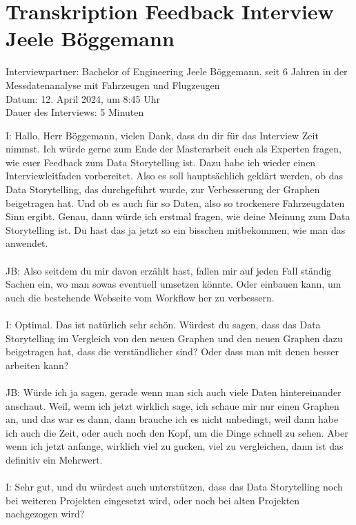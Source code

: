 \section{Transkription Feedback Interview Jeele Böggemann}
\label{appendix:interview_ende_boeggemann}
Interviewpartner: Bachelor of Engineering Jeele Böggemann, seit 6 Jahren in der Messdatenanalyse mit Fahrzeugen und Flugzeugen\\
Datum: 12. April 2024, um 8:45 Uhr\\
Dauer des Interviews: 5 Minuten\\

\begin{linenumbers}
\noindent
I: Hallo, Herr Böggemann, vielen Dank, dass du dir für das Interview Zeit nimmst. Ich würde gerne zum Ende der Masterarbeit euch als Experten fragen, wie euer Feedback zum Data Storytelling ist. Dazu habe ich wieder einen Interviewleitfaden vorbereitet. Also es soll hauptsächlich geklärt werden, ob das Data Storytelling, das durchgeführt wurde, zur Verbesserung der Graphen beigetragen hat. Und ob es auch für so Daten, also so trockenere Fahrzeugdaten Sinn ergibt. Genau, dann würde ich erstmal fragen, wie deine Meinung zum Data Storytelling ist. Du hast das ja jetzt so ein bisschen mitbekommen, wie man das anwendet.\\\\
JB: Also seitdem du mir davon erzählt hast, fallen mir auf jeden Fall ständig Sachen ein, wo man sowas eventuell umsetzen könnte. Oder einbauen kann, um auch die bestehende Webseite vom Workflow her zu verbessern.\\\\
I: Optimal. Das ist natürlich sehr schön. Würdest du sagen, dass das Data Storytelling im Vergleich von den neuen Graphen und den neuen Graphen dazu beigetragen hat, dass die verständlicher sind? Oder dass man mit denen besser arbeiten kann?\\\\
JB: Würde ich ja sagen, gerade wenn man sich auch viele Daten hintereinander anschaut. Weil, wenn ich jetzt wirklich sage, ich schaue mir nur einen Graphen an, und das war es dann, dann brauche ich es nicht unbedingt, weil dann habe ich auch die Zeit, oder auch noch den Kopf, um die Dinge schnell zu sehen. Aber wenn ich jetzt anfange, wirklich viel zu gucken, viel zu vergleichen, dann ist das definitiv ein Mehrwert.\\\\
I: Sehr gut, und du würdest auch unterstützen, dass das Data Storytelling noch bei weiteren Projekten eingesetzt wird, oder noch bei alten Projekten nachgezogen wird?\\\\

\end{linenumbers}
